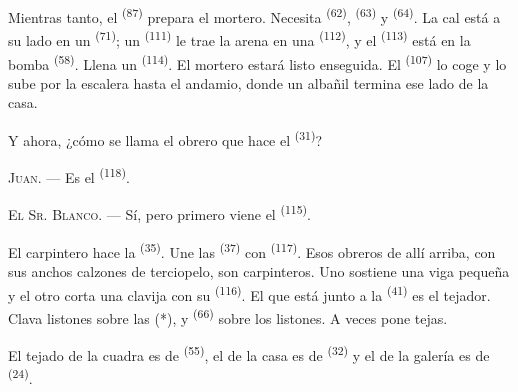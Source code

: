 Mientras tanto, el  \textsuperscript{(87)} prepara el mortero.
Necesita  \textsuperscript{(62)},  \textsuperscript{(63)} y
 \textsuperscript{(64)}. La cal está a su lado en un 
\textsuperscript{(71)}; un  \textsuperscript{(111)} le trae la
arena en una  \textsuperscript{(112)}, y el 
\textsuperscript{(113)} está en la bomba \textsuperscript{(58)}. Llena un 
\textsuperscript{(114)}. El mortero estará listo enseguida. El
 \textsuperscript{(107)} lo coge y lo sube por la escalera
hasta el andamio, donde un albañil termina ese lado de la casa.

Y ahora, ¿cómo se llama el obrero que hace el 
\textsuperscript{(31)}?

\textsc{Juan}. --- Es el  \textsuperscript{(118)}.

\VUsaut{3.0mm}
\VUsaut{3.0mm}

\textsc{El Sr. Blanco}. --- Sí, pero primero viene el 
\textsuperscript{(115)}.

El carpintero hace la  \textsuperscript{(35)}. Une las
 \textsuperscript{(37)} con  \textsuperscript{(117)}. Esos
obreros de allí arriba, con sus anchos calzones de terciopelo, son
carpinteros. Uno sostiene una viga pequeña y el otro corta una clavija
con su  \textsuperscript{(116)}. El que está junto a la
 \textsuperscript{(41)} es el tejador. Clava listones sobre las
 (*), y  \textsuperscript{(66)} sobre los listones.
A veces pone tejas.


El tejado de la cuadra es de  \textsuperscript{(55)}, el de la casa
es de  \textsuperscript{(32)} y el de la galería es de
 \textsuperscript{(24)}.

